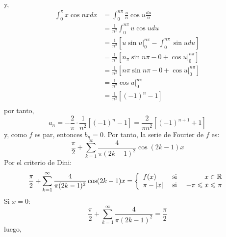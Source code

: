 \documentclass[12pt]{report}
\newcounter{it}
\theoremstyle{largebreak}
\renewcommand{\leq}{\ensuremath{\leqslant}}
\newcommand\abs[1]{\ensuremath{\left|#1\right|}}
\begin{document}
\begin{exa}
\begin{equation*}
\begin{split}
            \end{split}
        \end{equation*}
        y,
        \begin{equation*}
            \begin{split}
                \int_{0}^\pi x\cos nxdx&=\int_{0}^{n\pi}\frac{u}{n}\cos u\frac{du}{n}\\
                &=\frac{1}{n^2}\int_{0}^{n\pi}u\cos udu\\
                &=\frac{1}{n^2}[u\sin u\Big|_0^{n\pi}-\int_0^{n\pi}\sin udu]\\
                &=\frac{1}{n^2}[n_\pi\sin n\pi-0+\cos u\Big|_0^{n\pi}]\\
                &=\frac{1}{n^2}[n\pi\sin n\pi-0+\cos u\Big|_0^{n\pi}]\\
                &=\frac{1}{n^2}\cos u\Big|_0^{n\pi}\\
                &=\frac{1}{n^2}[(-1)^{n}-1] \\
            \end{split}
        \end{equation*}
        por tanto,
        \begin{equation*}
            a_n=-\frac{2}{\pi}\cdot\frac{1}{n^2}[(-1)^{ n}-1]=\frac{2}{\pi n^2}[(-1)^{ n+1}+1]
        \end{equation*}
        y, como $f$ es par, entonces $b_n=0$. Por tanto, la serie de Fourier de $f$ es:
        \begin{equation*}
            \frac{\pi}{2}+\sum_{ k=1}^\infty\frac{4}{\pi(2k-1)^2}\cos(2k-1)x
        \end{equation*}
        Por el criterio de Dini:
        \begin{equation*}
            \frac{\pi}{2}+\sum_{ k=1}^\infty\frac{4}{\pi(2k-1)^2}\cos(2k-1)x=\left\{
                \begin{array}{lcr}
                    f(x) & \textup{ si } & x\in\mathbb{R}\\
                    \pi-\abs{x} & \textup{ si } & -\pi\leq x\leq\pi\\
                \end{array}
            \right.
        \end{equation*}
        Si $x=0$:
        \begin{equation*}
            \frac{\pi}{2}+\sum_{ k=1}^\infty\frac{4}{\pi(2k-1)^2}=\frac{\pi}{2}
        \end{equation*}
        luego,
        \begin{equation*}

\end{equation*}
\end{exa}
\end{document}
